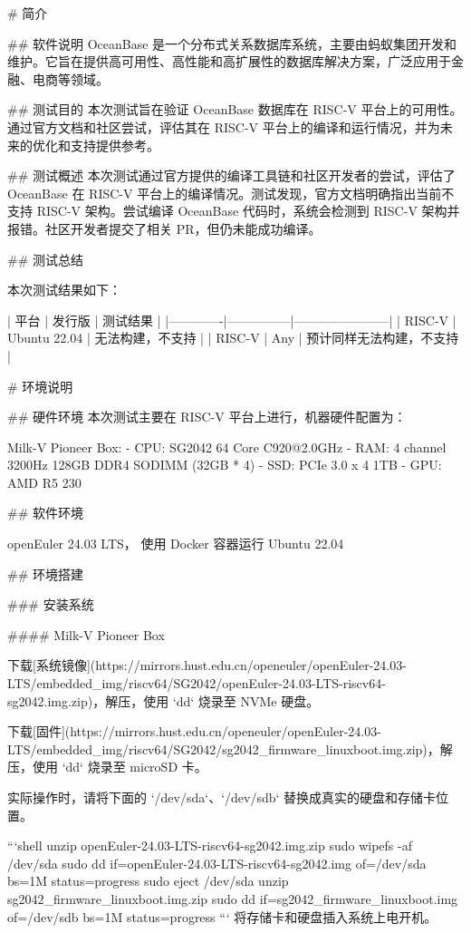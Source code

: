 \documentclass{article}
\begin{document}
\begin{markdown}

# 简介

## 软件说明
OceanBase 是一个分布式关系数据库系统，主要由蚂蚁集团开发和维护。它旨在提供高可用性、高性能和高扩展性的数据库解决方案，广泛应用于金融、电商等领域。

## 测试目的
本次测试旨在验证 OceanBase 数据库在 RISC-V 平台上的可用性。通过官方文档和社区尝试，评估其在 RISC-V 平台上的编译和运行情况，并为未来的优化和支持提供参考。

## 测试概述
本次测试通过官方提供的编译工具链和社区开发者的尝试，评估了 OceanBase 在 RISC-V 平台上的编译情况。测试发现，官方文档明确指出当前不支持 RISC-V 架构。尝试编译 OceanBase 代码时，系统会检测到 RISC-V 架构并报错。社区开发者提交了相关 PR，但仍未能成功编译。

## 测试总结

本次测试结果如下：

| 平台        | 发行版        | 测试结果              |
|-------------|---------------|-----------------------|
| RISC-V      |  Ubuntu 22.04      | 无法构建，不支持        |
| RISC-V      |  Any         | 预计同样无法构建，不支持 |

# 环境说明

## 硬件环境
本次测试主要在 RISC-V 平台上进行，机器硬件配置为：

Milk-V Pioneer Box:
- CPU: SG2042 64 Core C920@2.0GHz
- RAM: 4 channel 3200Hz 128GB DDR4 SODIMM (32GB * 4)
- SSD: PCIe 3.0 x 4 1TB
- GPU: AMD R5 230

## 软件环境

openEuler 24.03 LTS， 使用 Docker 容器运行 Ubuntu 22.04 

## 环境搭建

### 安装系统

#### Milk-V Pioneer Box

下载[系统镜像](https://mirrors.hust.edu.cn/openeuler/openEuler-24.03-LTS/embedded_img/riscv64/SG2042/openEuler-24.03-LTS-riscv64-sg2042.img.zip)，解压，使用 `dd` 烧录至 NVMe 硬盘。

下载[固件](https://mirrors.hust.edu.cn/openeuler/openEuler-24.03-LTS/embedded_img/riscv64/SG2042/sg2042_firmware_linuxboot.img.zip)，解压，使用 `dd` 烧录至 microSD 卡。

实际操作时，请将下面的 `/dev/sda`、`/dev/sdb` 替换成真实的硬盘和存储卡位置。

```shell
unzip openEuler-24.03-LTS-riscv64-sg2042.img.zip
sudo wipefs -af /dev/sda
sudo dd if=openEuler-24.03-LTS-riscv64-sg2042.img of=/dev/sda bs=1M status=progress
sudo eject /dev/sda
unzip sg2042_firmware_linuxboot.img.zip
sudo dd if=sg2042_firmware_linuxboot.img of=/dev/sdb bs=1M status=progress
```
将存储卡和硬盘插入系统上电开机。


\end{markdown}
\end{document}
